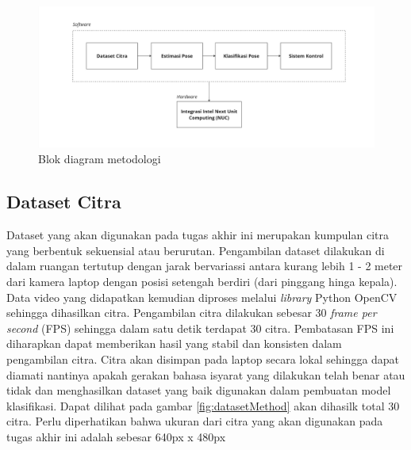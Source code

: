 \begin{figure}[H]
  \centering

  \includegraphics[scale=0.15]{gambar/bab3-block-diagram-nuc.jpg}

  \caption{Blok diagram metodologi}
  \label{fig:blockdiagrammethod}
\end{figure}

\subsection{Dataset Citra}
\label{sec:metodologidataset}

Dataset yang akan digunakan pada tugas akhir ini merupakan kumpulan citra yang berbentuk sekuensial atau berurutan. Pengambilan dataset dilakukan di dalam ruangan tertutup dengan jarak bervariassi antara kurang lebih 1 - 2 meter dari kamera laptop dengan posisi setengah berdiri (dari pinggang hinga kepala). Data video yang didapatkan kemudian diproses melalui \textit{library} Python OpenCV sehingga dihasilkan citra. Pengambilan citra dilakukan sebesar 30 \textit{frame per second} (FPS) sehingga dalam satu detik terdapat 30 citra. Pembatasan FPS ini diharapkan dapat memberikan hasil yang stabil dan konsisten dalam pengambilan citra. Citra akan disimpan pada laptop secara lokal sehingga dapat diamati nantinya apakah gerakan bahasa isyarat yang dilakukan telah benar atau tidak dan menghasilkan dataset yang baik digunakan dalam pembuatan model klasifikasi. Dapat dilihat pada gambar \ref{fig:datasetMethod} akan dihasilk total 30 citra. Perlu diperhatikan bahwa ukuran dari citra yang akan digunakan pada tugas akhir ini adalah sebesar 640px x 480px

